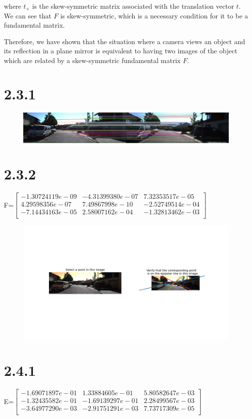 \documentclass{article}
\begin{document}
    where $t_\times$ is the skew-symmetric matrix associated with the translation vector $t$. We can see that $F$ is skew-symmetric, which is a necessary condition for it to be a fundamental matrix.
    
    Therefore, we have shown that the situation where a camera views an object and its reflection in a plane mirror is equivalent to having two images of the object which are related by a skew-symmetric fundamental matrix $F$.
    \section*{2.3.1}

    \begin{figure}[H]
        \centering
              \includegraphics[width=0.9\linewidth]{../homework/2_3_1_fig1.png}
    \end{figure}

    \section*{2.3.2}

    F=$\begin{bmatrix}
        -1.30724119e-09 & -4.31399380e-07 &  7.32353517e-05\\
        4.29598356e-07 &  7.49867998e-10 & -2.52749514e-04\\
        -7.14434163e-05 &  2.58007162e-04 & -1.32813462e-03\\
    \end{bmatrix}$\\
    \begin{figure}[H]
        \centering
              \includegraphics[width=0.9\linewidth]{../homework/2_3_2_displayEpipolarF.png}
    \end{figure}
    \section*{2.4.1}

    E=$\begin{bmatrix}
        -1.69071897e-01 &  1.33884605e-01 &  5.80582647e-03\\
        -1.32435582e-01 & -1.69139297e-01 &  2.28499567e-03\\
        -3.64977290e-03 & -2.91751291e-03 &  7.73717309e-05\\
    \end{bmatrix}$\\
    
\end{document}
